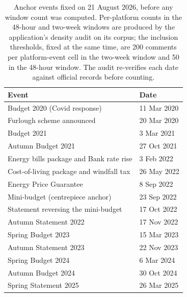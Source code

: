 \begin{table}[t]
\centering
\caption{Anchor events fixed on 21 August 2026, before any window count was computed. Per-platform counts in the 48-hour and two-week windows are produced by the application's density audit on its corpus; the inclusion thresholds, fixed at the same time, are 200 comments per platform-event cell in the two-week window and 50 in the 48-hour window. The audit re-verifies each date against official records before counting.}
\label{tab:anchors}
\begin{tabular}{ll}
\toprule
Event & Date \\
\midrule
Budget 2020 (Covid response) & 11 Mar 2020 \\
Furlough scheme announced & 20 Mar 2020 \\
Budget 2021 & 3 Mar 2021 \\
Autumn Budget 2021 & 27 Oct 2021 \\
Energy bills package and Bank rate rise & 3 Feb 2022 \\
Cost-of-living package and windfall tax & 26 May 2022 \\
Energy Price Guarantee & 8 Sep 2022 \\
Mini-budget (centrepiece anchor) & 23 Sep 2022 \\
Statement reversing the mini-budget & 17 Oct 2022 \\
Autumn Statement 2022 & 17 Nov 2022 \\
Spring Budget 2023 & 15 Mar 2023 \\
Autumn Statement 2023 & 22 Nov 2023 \\
Spring Budget 2024 & 6 Mar 2024 \\
Autumn Budget 2024 & 30 Oct 2024 \\
Spring Statement 2025 & 26 Mar 2025 \\
\bottomrule
\end{tabular}
\end{table}

